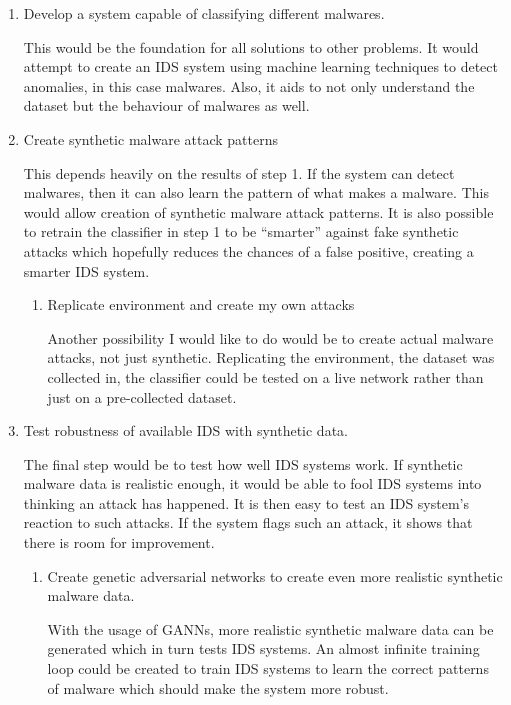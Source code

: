 \documentclass[11pt]{article}
\begin{document}
\begin{enumerate}
  \item Develop a system capable of classifying different malwares. 
  
 This would be the foundation for all solutions to other problems. It would attempt to create an IDS system using machine learning techniques to detect anomalies, in this case malwares. Also, it aids to not only understand the dataset but the behaviour of malwares as well. 

  \item Create synthetic malware attack patterns

  This depends heavily on the results of step 1. If the system can detect malwares, then it can also learn the pattern of what makes a malware. This would allow creation of synthetic malware attack patterns. It is also possible to retrain the classifier in step 1 to be “smarter” against fake synthetic attacks which hopefully reduces the chances of a false positive, creating a smarter IDS system. 

  \begin{enumerate}
    \item{Replicate environment and create my own attacks}

   Another possibility I would like to do would be to create actual malware attacks, not just synthetic. Replicating the environment, the dataset was collected in, the classifier could be tested on a live network rather than just on a pre-collected dataset. 
  \end{enumerate}  

  \item Test robustness of available IDS with synthetic data.

 The final step would be to test how well IDS systems work. If synthetic malware data is realistic enough, it would be able to fool IDS systems into thinking an attack has happened. It is then easy to test an IDS system’s reaction to such attacks. If the system flags such an attack, it shows that there is room for improvement. 

  \begin{enumerate}
    \item{Create genetic adversarial networks to create even more realistic synthetic malware data.}

   With the usage of GANNs, more realistic synthetic malware data can be generated which in turn tests IDS systems. An almost infinite training loop could be created to train IDS systems to learn the correct patterns of malware which should make the system more robust. 
  \end{enumerate}  
\end{enumerate}
\end{document}
